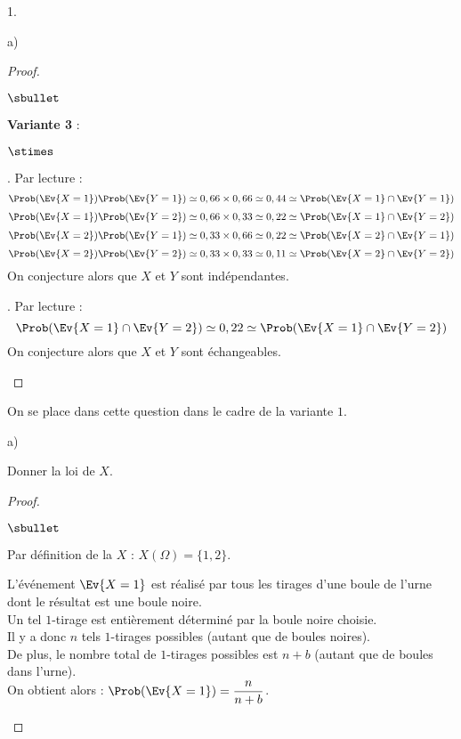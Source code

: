 \documentclass[11pt]{article}%
\begin{document}
\begin{noliste}{1.}
\begin{noliste}{a)}
\begin{proof}
\begin{noliste}{$\sbullet$}
    \item {\bf Variante 3} : 
    \begin{noliste}{$\stimes$}
    \item {}. Par lecture :
    \[
     \Prob(\Ev{X=1}) \Prob(\Ev{Y=1}) \simeq 0,66 \times 0,66
     \simeq 0,44 \simeq \Prob(\Ev{X=1} \cap \Ev{Y=1})
    \]
    \[
     \Prob(\Ev{X=1}) \Prob(\Ev{Y=2}) \simeq 0,66 \times 0,33
     \simeq 0,22 \simeq \Prob(\Ev{X=1} \cap \Ev{Y=2})
    \]
    \[
     \Prob(\Ev{X=2}) \Prob(\Ev{Y=1}) \simeq 0,33 \times 0,66
     \simeq 0,22 \simeq \Prob(\Ev{X=2} \cap \Ev{Y=1})
    \]
    \[
     \Prob(\Ev{X=2}) \Prob(\Ev{Y=2}) \simeq 0,33 \times 0,33
     \simeq 0,11 \simeq \Prob(\Ev{X=2} \cap \Ev{Y=2})
    \]
    On conjecture alors que $X$ et $Y$ sont indépendantes.
    
    \item {}. Par lecture :
    \[
     \Prob(\Ev{X=1} \cap \Ev{Y=2}) \simeq 
     0,22 \simeq \Prob(\Ev{X=1} \cap \Ev{Y=2})
    \]
    On conjecture alors que $X$ et $Y$ sont échangeables.
    \end{noliste}
  \end{noliste}
\end{proof}






\end{noliste}
\item On se place dans cette question dans le cadre de la variante $1$.
\begin{noliste}{a)}
\item Donner la loi de $X$.


\begin{proof}~
 \begin{noliste}{$\sbullet$}
  \item Par définition de la \var $X$ : $X(\Omega)=\{1,2\}$.
  
  \item L'événement $\Ev{X=1}$ est réalisé par tous les tirages d'une
    boule de l'urne dont le résultat est une boule noire.\\
    Un tel $1$-tirage est entièrement déterminé par la boule noire choisie.\\
    Il y a donc $n$ tels $1$-tirages possibles (autant que de boules
    noires).\\
    De plus, le nombre total de $1$-tirages possibles est $n+b$
    (autant que de boules dans l'urne).\\[.2cm]
    On obtient alors : $\Prob(\Ev{X=1})=\dfrac{n}{n+b}$.
  

\end{noliste}
\end{proof}
\end{noliste}
\end{noliste}
\end{document}
